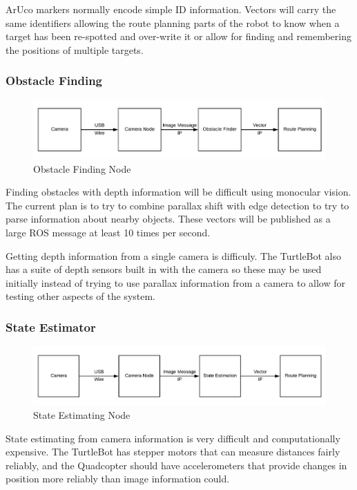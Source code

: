 \documentclass{article}
\begin{document}
	ArUco markers normally encode simple ID information. Vectors will carry the same identifiers allowing the route planning parts of the robot to know when a target has been re-spotted and over-write it or allow for finding and remembering the positions of multiple targets. 
	
	\subsubsection{Obstacle Finding}
	
	\begin{figure}[H]
		\centering
		\includegraphics[width=0.9\linewidth]{Camera-Obstacle}
		\caption{Obstacle Finding Node}
		\label{fig:obstacle}
	\end{figure}

	Finding obstacles with depth information will be difficult using monocular vision. The current plan is to try to combine parallax shift with edge detection to try to parse information about nearby objects. These vectors will be published as a large ROS message at least 10 times per second. 
	
	Getting depth information from a single camera is difficuly. The TurtleBot also has a suite of depth sensors built in with the camera so these may be used initially instead of trying to use parallax information from a camera to allow for testing other aspects of the system.
	
	\subsubsection{State Estimator}
	
	\begin{figure}[H]
		\centering
		\includegraphics[width=0.9\linewidth]{Camera-State-Route}
		\caption{State Estimating Node}
		\label{fig:state}
	\end{figure}

	State estimating from camera information is very difficult and computationally expensive. The TurtleBot has stepper motors that can measure distances fairly reliably, and the Quadcopter should have accelerometers that provide changes in position more reliably than image information could. 
	
\end{document}
